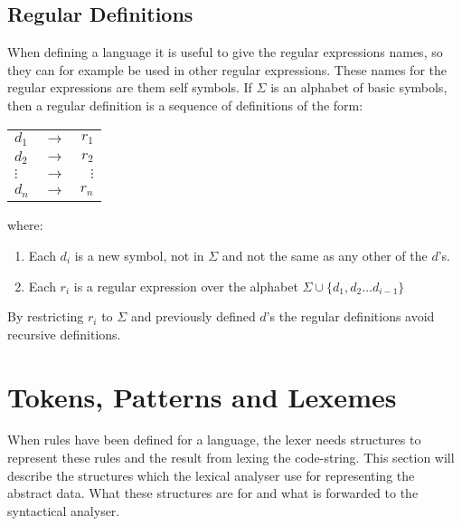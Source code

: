 \subsection{Regular Definitions}
When defining a language it is useful to give the regular expressions names, 
so they can for example be used in other regular expressions. These names for
the regular expressions are them self symbols. If $\Sigma$ is an alphabet of 
basic symbols, then a regular definition is a sequence of definitions of the form:
\begin{center}
\begin{tabular}{l c r}
$d_1$ & $\to$ & $r_1$\\
$d_2$ & $\to$ & $r_2$\\
$\vdots$ & $\to$ & $\vdots$\\
$d_n$ & $\to$ & $r_n$\\

\end{tabular}
\end{center}
where:
\begin{enumerate}
\item Each $d_i$ is a new symbol, not in $\Sigma$ and not the same as any other 
of the $d$'s.
\item Each $r_i$ is a regular expression over the alphabet $\Sigma  \cup \{d_1, 
d_2 \dots d_{i-1}\}$
\end{enumerate}
By restricting $r_i$ to $\Sigma$ and previously defined $d$'s the regular 
definitions avoid recursive definitions.  
\cite{Aho2006}

\section{Tokens, Patterns and Lexemes}
When rules have been defined for a language, the lexer needs structures to
represent these rules and the result from lexing the code-string. 
This section will describe the structures which the lexical analyser use
for representing the abstract data. What these structures are for and what is 
forwarded to the syntactical analyser. 

